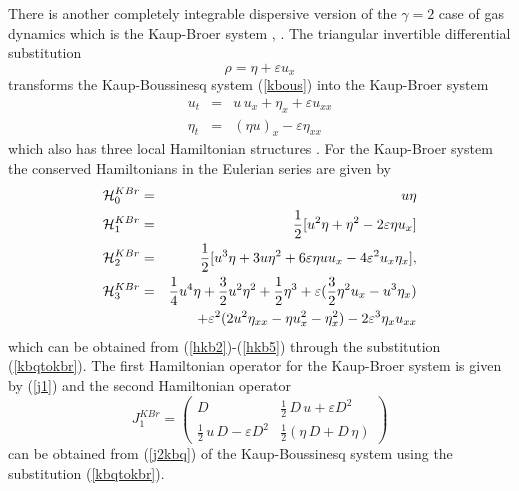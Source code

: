 \documentclass[a4paper,12pt]{article}
\begin{document}
There is another completely integrable dispersive version of the
$\gamma=2$ case of gas dynamics which is the Kaup-Broer system
\cite{kaup1}, \cite{broer}. The triangular invertible differential
substitution
\begin{equation}
\rho =\eta +\varepsilon u_{x} \label{kbqtokbr}
\end{equation}
transforms the Kaup-Boussinesq system (\ref{kbous}) into the
Kaup-Broer system
\begin{eqnarray}
u_{t} &= & u\, u_{x} +\eta_x +\varepsilon u_{xx}  \nonumber
\\ \eta _{t} &=& \left( \eta u \right)_x -\varepsilon \eta _{xx}
\label{kbroer}
\end{eqnarray}
which also has three local Hamiltonian structures \cite{kuper}.
For the Kaup-Broer system the conserved Hamiltonians in the
Eulerian series are given by
\begin{eqnarray}
{\cal H}_{0}^{KBr} &=&u\eta \\ {\cal H}_{1}^{KBr} &=&
\frac{1}{2}[u^{2}\eta +\eta ^{2}-2\varepsilon \eta u_{x}]\\ {\cal
H}_{2}^{KBr}&=&\frac{1}{2} [u^{3}\eta +3u\eta ^{2}+6\varepsilon
\eta uu_{x}-4\varepsilon ^{2}u_{x}\eta _{x}], \\ {\cal
H}_{3}^{KBr} &=&\frac{1}{4}u^{4}\eta +\frac{3}{2}u^{2}\eta
^{2}+\frac{1}{2} \eta ^{3}+\varepsilon (\frac{3}{2}\eta
^{2}u_{x}-u^{3}\eta _{x})
\\ && +\varepsilon ^{2}(2u^{2}\eta _{xx}-\eta u_{x}^{2}-\eta
_{x}^{2})-2\varepsilon ^{3}\eta _{x}u_{xx}  \nonumber
\end{eqnarray}
which can be obtained from (\ref{hkb2})-(\ref{hkb5}) through the
substitution (\ref{kbqtokbr}). The first Hamiltonian operator for
the Kaup-Broer system is given by (\ref{j1}) and the second
Hamiltonian operator
\begin{equation} J_1^{KBr} = \left( \begin{array}{cc}  D &
 \frac{1}{2} \, D \, u + \varepsilon D^{2} \\ \frac{1}{2} \, u\, D
-\varepsilon D^{2} & \frac{1}{2} ( \eta \, D + D \, \eta )
\end{array} \right)
\label{j2kbr}
\end{equation}
can be obtained from (\ref{j2kbq}) of the Kaup-Boussinesq system
using the substitution (\ref{kbqtokbr}).
\end{document}
